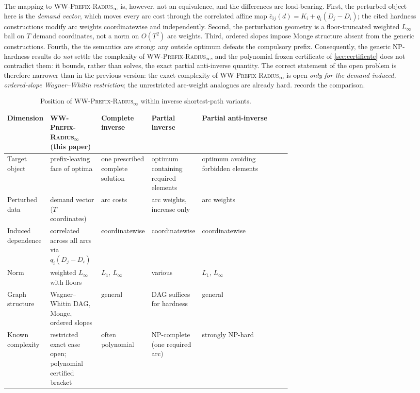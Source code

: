 \documentclass[11pt]{article}
\theoremstyle{definition}
\newcommand{\WWR}{\textsc{WW-Prefix-Radius}\ensuremath{_{\infty}}}
\begin{document}
The mapping to \WWR{} is, however, not an equivalence, and the differences are load-bearing. First, the perturbed object here is the \emph{demand vector}, which moves every arc cost through the correlated affine map $\bar c_{ij}(d)=K_i+q_i(D_j-D_i)$; the cited hardness constructions modify arc weights coordinatewise and independently. Second, the perturbation geometry is a floor-truncated weighted $L_\infty$ ball on $T$ demand coordinates, not a norm on $O(T^2)$ arc weights. Third, ordered slopes impose Monge structure absent from the generic constructions. Fourth, the tie semantics are strong: any outside optimum defeats the compulsory prefix. Consequently, the generic NP-hardness results do \emph{not} settle the complexity of \WWR{}, and the polynomial frozen certificate of \cref{sec:certificate} does not contradict them: it bounds, rather than solves, the exact partial anti-inverse quantity. The correct statement of the open problem is therefore narrower than in the previous version: the exact complexity of \WWR{} is open \emph{only for the demand-induced, ordered-slope Wagner--Whitin restriction}; the unrestricted arc-weight analogues are already hard.  records the comparison.

\begin{table}[t]
\centering
\caption{Position of \WWR{} within inverse shortest-path variants.}
\label{tab:inverse}
\small
\begin{tabularx}{\linewidth}{@{}>{\raggedright\arraybackslash}p{0.155\linewidth}>{\raggedright\arraybackslash}p{0.185\linewidth}>{\raggedright\arraybackslash}p{0.16\linewidth}>{\raggedright\arraybackslash}p{0.175\linewidth}>{\raggedright\arraybackslash}X@{}}
\toprule
Dimension & \WWR{} (this paper) & Complete inverse \parencite{AhujaOrlin2001} & Partial inverse \parencite{LeyMerkert2025} & Partial anti-inverse \parencite{Gassner2009} \\
\midrule
Target object & prefix-leaving face of optima & one prescribed complete solution & optimum containing required elements & optimum avoiding forbidden elements \\
Perturbed data & demand vector ($T$ coordinates) & arc costs & arc weights, increase only & arc weights \\
Induced dependence & correlated across all arcs via $q_i(D_j-D_i)$ & coordinatewise & coordinatewise & coordinatewise \\
Norm & weighted $L_\infty$ with floors & $L_1$, $L_\infty$ & various & $L_1$, $L_\infty$ \\
Graph structure & Wagner--Whitin DAG, Monge, ordered slopes & general & DAG suffices for hardness & general \\
Known complexity & restricted exact case open; polynomial certified bracket & often polynomial & NP-complete (one required arc) & strongly NP-hard \\
\bottomrule
\end{tabularx}
\end{table}
\end{document}

